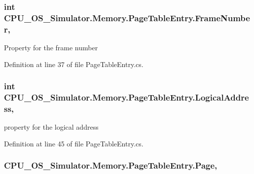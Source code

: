 \subsubsection[{Frame\+Number}]{\setlength{\rightskip}{0pt plus 5cm}int C\+P\+U\+\_\+\+O\+S\+\_\+\+Simulator.\+Memory.\+Page\+Table\+Entry.\+Frame\+Number\hspace{0.3cm}{\ttfamily [get]}, {\ttfamily [set]}}\label{class_c_p_u___o_s___simulator_1_1_memory_1_1_page_table_entry_a4c1fb37bb101546867d77a4f781ba51d}


Property for the frame number 



Definition at line 37 of file Page\+Table\+Entry.\+cs.

\hypertarget{class_c_p_u___o_s___simulator_1_1_memory_1_1_page_table_entry_a22a89428526ff3d2c8247a14eba38242}{}
\subsubsection[{Logical\+Address}]{\setlength{\rightskip}{0pt plus 5cm}int C\+P\+U\+\_\+\+O\+S\+\_\+\+Simulator.\+Memory.\+Page\+Table\+Entry.\+Logical\+Address\hspace{0.3cm}{\ttfamily [get]}, {\ttfamily [set]}}\label{class_c_p_u___o_s___simulator_1_1_memory_1_1_page_table_entry_a22a89428526ff3d2c8247a14eba38242}


property for the logical address 



Definition at line 45 of file Page\+Table\+Entry.\+cs.

\hypertarget{class_c_p_u___o_s___simulator_1_1_memory_1_1_page_table_entry_aa592969e0204f85ad96a9ab76ca7f50d}{}
\subsubsection[{Page}]{ C\+P\+U\+\_\+\+O\+S\+\_\+\+Simulator.\+Memory.\+Page\+Table\+Entry.\+Page\hspace{0.3cm}{\ttfamily [get]}, {\ttfamily [set]}}\label{class_c_p_u___o_s___simulator_1_1_memory_1_1_page_table_entry_aa592969e0204f85ad96a9ab76ca7f50d}


